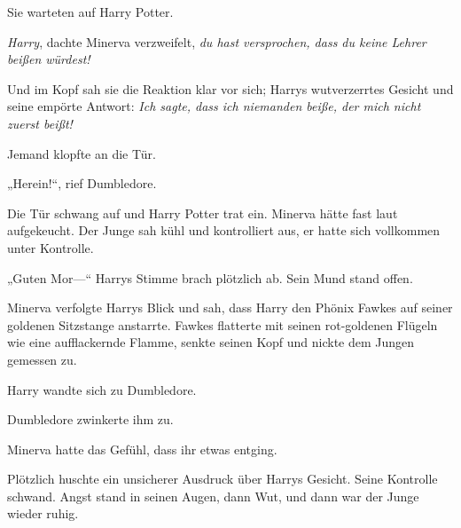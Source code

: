 Sie warteten auf Harry Potter.

\emph{Harry}, dachte Minerva verzweifelt, \emph{du hast versprochen, dass du keine Lehrer beißen würdest!}

Und im Kopf sah sie die Reaktion klar vor sich; Harrys wutverzerrtes Gesicht und seine empörte Antwort: \emph{Ich sagte, dass ich niemanden beiße, der mich nicht zuerst beißt!}

Jemand klopfte an die Tür.

„Herein!“, rief Dumbledore.

Die Tür schwang auf und Harry Potter trat ein. Minerva hätte fast laut aufgekeucht. Der Junge sah kühl und kontrolliert aus, er hatte sich vollkommen unter Kontrolle.

„Guten Mor—“ Harrys Stimme brach plötzlich ab. Sein Mund stand offen.

Minerva verfolgte Harrys Blick und sah, dass Harry den Phönix Fawkes auf seiner goldenen Sitzstange anstarrte. Fawkes flatterte mit seinen rot-goldenen Flügeln wie eine aufflackernde Flamme, senkte seinen Kopf und nickte dem Jungen gemessen zu.

Harry wandte sich zu Dumbledore.

Dumbledore zwinkerte ihm zu.

Minerva hatte das Gefühl, dass ihr etwas entging.

Plötzlich huschte ein unsicherer Ausdruck über Harrys Gesicht. Seine Kontrolle schwand. Angst stand in seinen Augen, dann Wut, und dann war der Junge wieder ruhig.

